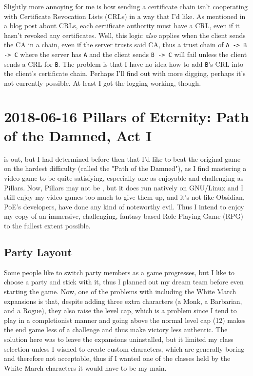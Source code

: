 \documentclass{article}
\begin{document}
Slightly more annoying for me is how sending a certificate chain isn't cooperating with Certificate Revocation Lists (CRLs) in a way that I'd like.  As mentioned in a  blog post about CRLs, each certificate authority must have a CRL, even if it hasn't revoked any certificates.  Well, this logic \emph{also} applies when the client sends the CA in a chain, even if the server trusts said CA, thus a trust chain of \texttt{A -> B -> C} where the server has \texttt{A} and the client sends \texttt{B -> C} will fail unless the client sends a CRL for \texttt{B}.  The problem is that I have no idea how to add \texttt{B}'s CRL into the client's certificate chain.  Perhaps I'll find out with more digging, perhaps it's not currently possible.  At least I got the logging working, though.


\section{2018-06-16 Pillars of Eternity: Path of the Damned, Act I}
 is out, but I had determined before then that I'd like to beat the original game on the hardest difficulty (called the "Path of the Damned"), as I find mastering a video game to be quite satisfying, especially one as enjoyable and challenging as Pillars.  Now, Pillars may not be , but it does run natively on GNU/Linux and I still enjoy my video games too much to give them up, and it's not like Obsidian, PoE's developers, have done any kind of noteworthy evil.  Thus I intend to enjoy my copy of an immersive, challenging, fantasy-based Role Playing Game (RPG) to the fullest extent possible.

\subsection{Party Layout}
Some people like to switch party members as a game progresses, but I like to choose a party and stick with it, thus I planned out my dream team before even starting the game.  Now, one of the problems with including the White March expansions is that, despite adding three extra characters (a Monk, a Barbarian, and a Rogue), they also raise the level cap, which is a problem since I tend to play in a completionist manner and going above the normal level cap (12) makes the end game less of a challenge and thus make victory less authentic.  The solution here was to leave the expansions uninstalled, but it limited my class selection unless I wished to create custom characters, which are generally boring and therefore not acceptable, thus if I wanted one of the classes held by the White March characters it would have to be my main.
\end{document}
